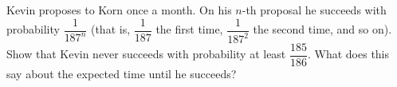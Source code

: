 Kevin proposes to Korn once a month. On his $n$-th proposal he succeeds with probability $\dfrac1{187^n}$ (that is, $\dfrac1{187}$ the first time, $\dfrac1{187^2}$ the second time, and so on). Show that Kevin never succeeds with probability at least $\dfrac{185}{186}$. What does this say about the expected time until he succeeds?
